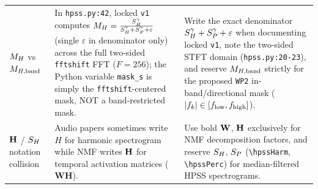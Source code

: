 \begin{table}[htbp]
\begin{tabular}{@{}>{\raggedright\arraybackslash}p{} >{\raggedright\arraybackslash}p{} >{\raggedright\arraybackslash}p{}@{}}
\addlinespace
$M_H$ vs $M_{H,\mathrm{band}}$ &
In \texttt{hpss.py:42}, locked \texttt{v1} computes $M_H = \frac{S_H^\gamma}{S_H^\gamma + S_P^\gamma + \varepsilon}$ (single $\varepsilon$ in denominator only) across the full two-sided \texttt{fftshift} FFT ($F=256$); the Python variable \texttt{mask\_s} is simply the \texttt{fftshift}-centered mask, NOT a band-restricted mask. &
Write the exact denominator $S_H^\gamma + S_P^\gamma + \varepsilon$ when documenting locked \texttt{v1}, note the two-sided STFT domain (\texttt{hpss.py:20-23}), and reserve $M_{H,\mathrm{band}}$ strictly for the proposed \texttt{WP2} in-band/directional mask ($|f_k| \in [f_{\mathrm{low}}, f_{\mathrm{high}}]$). \\
\addlinespace
$\mathbf{H}$ / $S_H$ notation collision &
Audio papers sometimes write $H$ for harmonic spectrogram while NMF writes $\mathbf{H}$ for temporal activation matrices ($\mathbf{W}\mathbf{H}$). &
Use bold $\mathbf{W}$, $\mathbf{H}$ exclusively for NMF decomposition factors, and reserve $S_H$, $S_P$ (\texttt{\textbackslash hpssHarm}, \texttt{\textbackslash hpssPerc}) for median-filtered HPSS spectrograms. \\
\bottomrule
\end{tabular}
\end{table}

\fi
